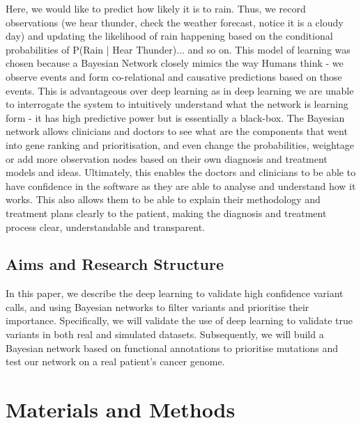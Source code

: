 \documentclass{article}
\begin{document}
Here, we would like to predict how likely it is to rain. Thus, we record observations (we hear thunder, check the weather forecast, notice it is a cloudy day) and updating the likelihood of rain happening based on the conditional probabilities of P(Rain | Hear Thunder)... and so on. This model of learning was chosen because a Bayesian Network closely mimics the way Humans think - we observe events and form co-relational and causative predictions based on those events. This is advantageous over deep learning as in deep learning we are unable to interrogate the system to intuitively understand what the network is learning form - it has high predictive power but is essentially a black-box. The Bayesian network allows clinicians and doctors to see what are the components that went into gene ranking and prioritisation, and even change the probabilities, weightage or add more observation nodes based on their own diagnosis and treatment models and ideas. Ultimately, this enables the doctors and clinicians to be able to have confidence in the software as they are able to analyse and understand how it works. This also allows them to be able to explain their methodology and treatment plans clearly to the patient, making the diagnosis and treatment process clear, understandable and transparent.

\subsection{Aims and Research Structure}
In this paper, we describe the deep learning to validate high confidence variant calls, and using Bayesian networks to filter variants and prioritise their importance. Specifically, we will validate the use of deep learning to validate true variants in both real and simulated datasets. Subsequently, we will build a Bayesian network based on functional annotations to prioritise mutations and test our network on a real patient's cancer genome.

\newpage
\section{Materials and Methods}
\end{document}
